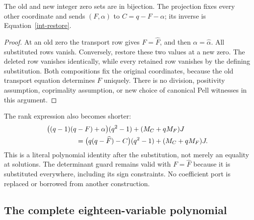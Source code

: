 \begin{proposition}
\label{int-projection-thm}
The old and new integer zero sets are in bijection.  The projection fixes
every other coordinate and sends $(F,\alpha)$ to $C=q-F-\alpha$;
its inverse is Equation~\eqref{int-restore}.
\end{proposition}
\begin{proof}
At an old zero the transport row gives $F=\widehat F$, and then
$\alpha=\widehat\alpha$.  All substituted rows vanish.  Conversely,
restore these two values at a new zero.  The deleted row vanishes
identically, while every retained row vanishes by the defining
substitution.  Both compositions fix the original coordinates, because
the old transport equation determines $F$ uniquely.  There is no division,
positivity assumption, coprimality assumption, or new choice of canonical
Pell witnesses in this argument.
\end{proof}

The rank expression also becomes shorter:
\begin{align}
 &\bigl((q-1)(q-F)+\alpha\bigr)(q^2-1)
       +(M_C+qM_F)J \notag\\
 &\hspace{15mm}=
   \bigl(q(q-\widehat F)-C\bigr)(q^2-1)
       +(M_C+qM_F)J.                         \label{int-rank-identity}
\end{align}
This is a literal polynomial identity after the substitution, not merely
an equality at solutions.  The determinant guard remains valid with
$F=\widehat F$ because it is substituted everywhere, including its sign
constraints.  No coefficient port is replaced or borrowed from another
construction.

\subsection{The complete eighteen-variable polynomial}
\label{int-polynomial}

